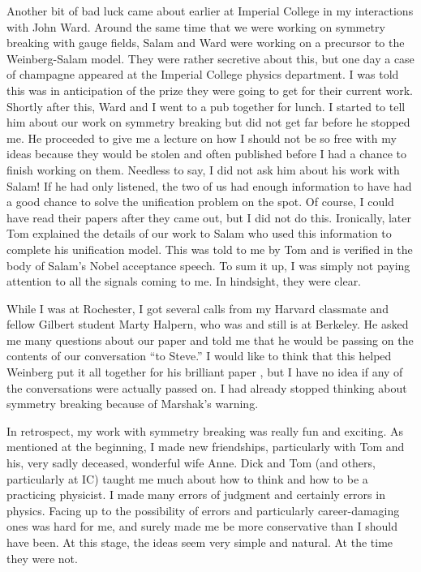 \documentclass[12pt]{article}
\begin{document}
   Another bit of bad luck came about earlier at Imperial College in my
   interactions with John Ward. Around the same time that we were working on
   symmetry breaking with gauge fields, Salam and Ward were working on a
   precursor to the Weinberg-Salam model. They were rather secretive about
   this, but one day a case of champagne appeared at the Imperial College
   physics department. I was told this was in anticipation of the prize they
   were going to get for their current work. Shortly after this, Ward and I
   went to a pub together for lunch. I started to tell him about our work on
   symmetry breaking but did not get far before he stopped me. He proceeded to
   give me a lecture on how I should not be so free with my ideas because they
   would be stolen and often published before I had a chance to finish working
   on them. Needless to say, I did not ask him about his work with Salam! If
   he had only listened, the two of us had enough information to have had a
   good chance to solve the unification problem on the spot. Of course, I
   could have read their papers after they came out, but I did not do
   this. Ironically, later Tom explained the details of our work to Salam who
   used this information to complete his unification model. This was told to
   me by Tom and is verified in the body of Salam's Nobel acceptance
   speech. To sum it up, I was simply not paying attention to all the signals
   coming to me. In hindsight, they were clear.

   While I was at Rochester, I got several calls from my Harvard classmate and fellow Gilbert student
   Marty Halpern, who was and still is at Berkeley. He asked me many questions about
   our paper and told me that he would be passing on the contents of our conversation  ``to
   Steve.'' I would like to think that this helped Weinberg put it all together
   for his brilliant paper \cite{sw;1967}, but I have no idea if any of the conversations were
   actually passed on. I had already stopped thinking about symmetry breaking
   because of Marshak's warning.


   In retrospect, my work with symmetry breaking was really fun and
   exciting. As mentioned at the beginning, I made new friendships,
   particularly with Tom and his, very sadly deceased, wonderful wife
   Anne. Dick and Tom (and others, particularly at IC) taught me much
   about how to think and how to be a practicing physicist. I made
   many errors of judgment and certainly errors in physics. Facing up
   to the possibility of errors and particularly career-damaging ones
   was hard for me, and surely made me be more conservative than I
   should have been. At this stage, the ideas seem very simple and
   natural. At the time they were not.
\end{document}
